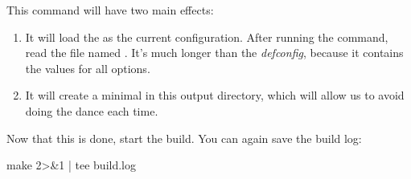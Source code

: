 This command will have two main effects:

\begin{enumerate}

\item It will load the  as the current
  configuration. After running the command, read the file named
  . It's much longer than the {\em defconfig}, because
  it contains the values for all options.

\item It will create a minimal  in this output
  directory, which will allow us to avoid doing the  dance each time.

\end{enumerate}

Now that this is done, start the build. You can again save the build
log:

\begin{bashinput}
make 2>&1 | tee build.log
\end{bashinput}
